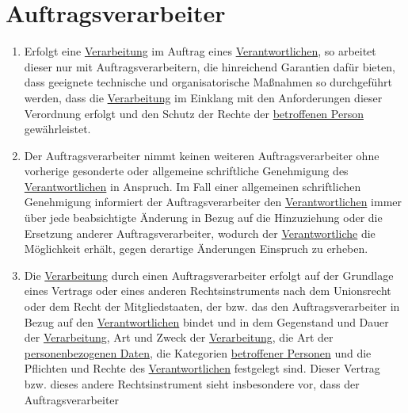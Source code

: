 \chapter{Auftragsverarbeiter}
\label{ch:28}


\begin{enumerate}

  \item Erfolgt eine \hyperref[itm:04-2]{Verarbeitung} im Auftrag eines \hyperref[itm:04-7]{Verantwortlichen}, so arbeitet dieser nur mit Auftragsverarbeitern,
   die hinreichend Garantien dafür bieten, dass geeignete technische und organisatorische Maßnahmen so durchgeführt
   werden, dass die \hyperref[itm:04-2]{Verarbeitung} im Einklang mit den Anforderungen dieser Verordnung erfolgt und den Schutz der Rechte
   der \hyperref[itm:04-1]{betroffenen Person} gewährleistet.
  \label{itm:28-1}

  \item Der Auftragsverarbeiter nimmt keinen weiteren Auftragsverarbeiter ohne vorherige gesonderte oder allgemeine
   schriftliche Genehmigung des \hyperref[itm:04-7]{Verantwortlichen} in Anspruch. Im Fall einer allgemeinen schriftlichen Genehmigung
   informiert der Auftragsverarbeiter den \hyperref[itm:04-7]{Verantwortlichen} immer über jede beabsichtigte Änderung in Bezug auf die
   Hinzuziehung oder die Ersetzung anderer Auftragsverarbeiter, wodurch der \hyperref[itm:04-7]{Verantwortliche} die Möglichkeit erhält,
   gegen derartige Änderungen Einspruch zu erheben.
  \label{itm:28-2}

  \item Die \hyperref[itm:04-2]{Verarbeitung} durch einen Auftragsverarbeiter erfolgt auf der Grundlage eines Vertrags oder eines anderen
   Rechtsinstruments nach dem Unionsrecht oder dem Recht der Mitgliedstaaten, der bzw. das den Auftragsverarbeiter in
   Bezug auf den \hyperref[itm:04-7]{Verantwortlichen} bindet und in dem Gegenstand und Dauer der \hyperref[itm:04-2]{Verarbeitung}, Art und Zweck der
   \hyperref[itm:04-2]{Verarbeitung}, die Art der \hyperref[itm:04-1]{personenbezogenen Daten}, die Kategorien \hyperref[itm:04-1]{betroffener Personen} und die Pflichten und Rechte
   des \hyperref[itm:04-7]{Verantwortlichen} festgelegt sind. Dieser Vertrag bzw. dieses andere Rechtsinstrument sieht insbesondere vor,
   dass der Auftragsverarbeiter
  \label{itm:28-3-1}

  \begin{enumerate}
  

\end{enumerate}
\end{enumerate}
